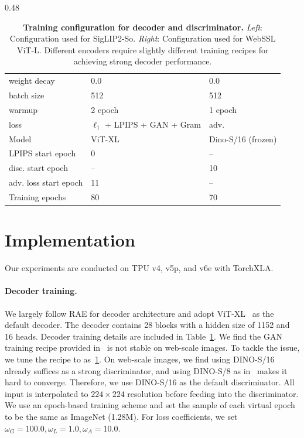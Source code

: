 \documentclass[10pt,twocolumn,letterpaper]{article}
\begin{document}
\begin{table}[t!]
\begin{subtable}{0.48\textwidth}
\begin{tabular}{lll}
weight decay               & 0.0                 & 0.0 \\
batch size                 & 512                 & 512 \\
warmup                     & 2 epoch            & 1 epoch \\
loss                       & {\scriptsize $\ell_1$ + LPIPS + GAN + Gram} & adv. \\
Model                       & ViT-XL& Dino-S/16 (frozen) \\
LPIPS start epoch          & 0 & -- \\
disc. start epoch    & -- &10 \\
adv. loss start epoch    & 11 & --\\
Training epochs           & 80 & 70 \\
\bottomrule
\end{tabular}
\end{subtable}
\caption{\textbf{Training configuration for decoder and discriminator.}
\textit{Left}: Configuration used for SigLIP2-So.
\textit{Right}: Configuration used for WebSSL ViT-L.
Different encoders require slightly different training recipes for achieving strong decoder performance. }
\label{tab:recon_training_config}
\end{table}
\section{Implementation}\label{appendix: implementation}
Our experiments are conducted on TPU v4, v5p, and v6e with TorchXLA.
\paragraph{Decoder training.} We largely follow RAE for decoder architecture and adopt ViT-XL~\citep{vit} as the default decoder. The decoder contains 28 blocks with a hidden size of 1152 and 16 heads.
Decoder training details are included in Table~\ref{tab:recon_training_config}. We find the GAN training recipe provided in~\citep{zheng2025diffusion} is not stable on web-scale images. To tackle the issue, we tune the recipe to as~\cref{tab:recon_training_config}. On web-scale images, we find using DINO-S/16 already suffices as a strong discriminator, and using DINO-S/8 as in~\citep{zheng2025diffusion} makes it hard to converge. Therefore, we use DINO-S/16 as the default discriminator. All input is interpolated to $224 \times 224$ resolution before feeding into the discriminator. We use an epoch-based training scheme and set the sample of each virtual epoch to be the same as ImageNet (1.28M). For loss coefficients, we set $\omega_G = 100.0, \omega_L = 1.0, \omega_A = 10.0$.
\end{document}
